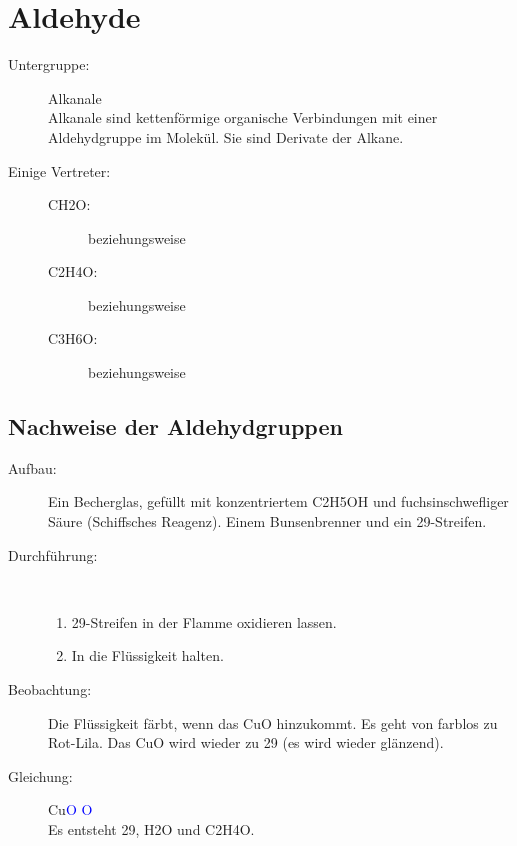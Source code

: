 \section{Aldehyde}
\begin{description}
	\item[Untergruppe:] Alkanale \\
		Alkanale sind kettenförmige organische Verbindungen mit einer
		Aldehydgruppe im Molekül. Sie sind Derivate der Alkane.
	\item[Einige Vertreter:]
	\begin{description}
		\item[\ac{CH2O}:]  \hfil beziehungsweise 
		\item[\ac{C2H4O}:] 
			\hfil beziehungsweise 
		\item[\ac{C3H6O}:] 
			\hfil beziehungsweise 
	\end{description}
\end{description}

\subsection{Nachweise der Aldehydgruppen}
\begin{description}
	\item[Aufbau:] Ein Becherglas, gefüllt mit konzentriertem \ac{C2H5OH}
		und fuchsinschwefliger Säure (Schiffsches Reagenz).
		Einem Bunsenbrenner und ein \ac{29}-Streifen.
	\item[Durchführung:]~
	\begin{enumerate}
		\item \ac{29}-Streifen in der Flamme oxidieren lassen.
		\item In die Flüssigkeit halten.
	\end{enumerate}
	\item[Beobachtung:] Die Flüssigkeit färbt, wenn das \ac{CuO} hinzukommt.
		Es geht von farblos zu Rot-Lila.
		Das \ac{CuO} wird wieder zu \ac{29} (es wird wieder glänzend).
	\item[Gleichung:]  \chemsign{+}
		Cu\textcolor{blue}{O} \chemsign{\ce{->}}  \chemsign{+}
		\textcolor{red}{}\textcolor{blue}{O} \chemsign{+}
		 \\[0.5em]
		Es entsteht \ac{29}, \ac{H2O} und \ac{C2H4O}. %
\end{description}

